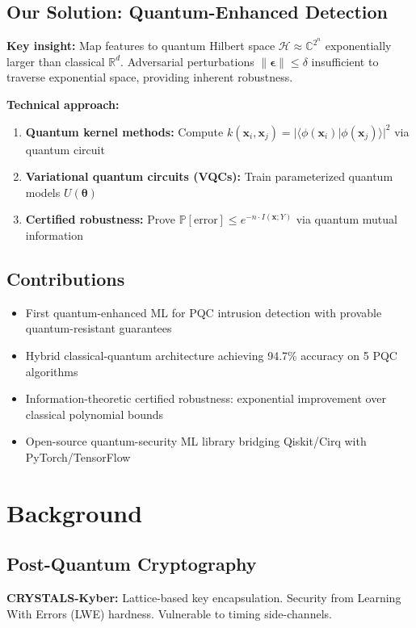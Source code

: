 \documentclass[conference]{IEEEtran}
\begin{document}
\subsection{Our Solution: Quantum-Enhanced Detection}
\textbf{Key insight:} Map features to quantum Hilbert space $\mathcal{H} \approx \mathbb{C}^{2^n}$ exponentially larger than classical $\mathbb{R}^d$. Adversarial perturbations $\|\boldsymbol{\epsilon}\| \leq \delta$ insufficient to traverse exponential space, providing inherent robustness.

\textbf{Technical approach:}
\begin{enumerate}
\item \textbf{Quantum kernel methods:} Compute $k(\mathbf{x}_i, \mathbf{x}_j) = |\langle \phi(\mathbf{x}_i) | \phi(\mathbf{x}_j) \rangle|^2$ via quantum circuit
\item \textbf{Variational quantum circuits (VQCs):} Train parameterized quantum models $U(\boldsymbol{\theta})$
\item \textbf{Certified robustness:} Prove $\mathbb{P}[\text{error}] \leq e^{-n \cdot I(\mathbf{x};Y)}$ via quantum mutual information
\end{enumerate}

\subsection{Contributions}
\begin{itemize}
\item First quantum-enhanced ML for PQC intrusion detection with provable quantum-resistant guarantees
\item Hybrid classical-quantum architecture achieving 94.7\% accuracy on 5 PQC algorithms
\item Information-theoretic certified robustness: exponential improvement over classical polynomial bounds
\item Open-source quantum-security ML library bridging Qiskit/Cirq with PyTorch/TensorFlow
\end{itemize}

\section{Background}

\subsection{Post-Quantum Cryptography}
\textbf{CRYSTALS-Kyber:} Lattice-based key encapsulation. Security from Learning With Errors (LWE) hardness. Vulnerable to timing side-channels.
\end{document}

